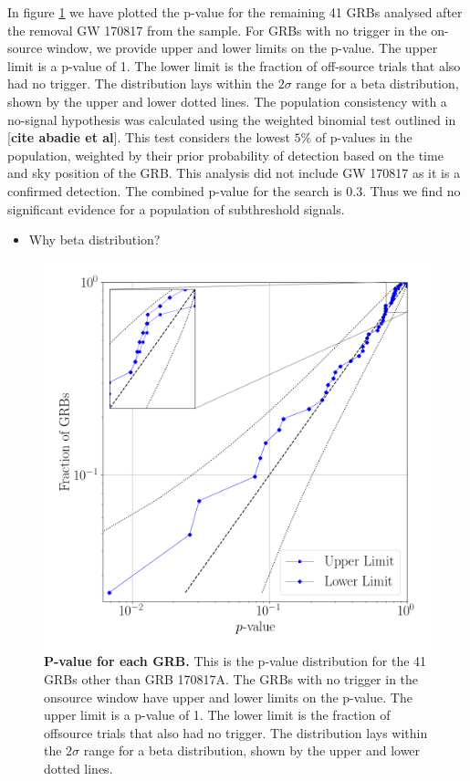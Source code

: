 \documentclass[11pt]{cuthesis}
\begin{document}
In figure \ref{fig:pvalue} we have plotted the p-value for the remaining 41 GRBs analysed after the removal GW 170817 from the sample. For GRBs with no trigger in the on-source window, we provide upper and lower limits on the p-value. The upper limit is a p-value of 1. The lower limit is the fraction of off-source trials that also had no trigger. The distribution lays within the $2\sigma$ range for a beta distribution, shown by the upper and lower dotted lines. The population consistency with a no-signal hypothesis was calculated using the weighted binomial test outlined in [\textbf{cite abadie et al}]. This test considers the lowest $5\%$ of p-values in the population, weighted by their prior probability of detection based on the time and sky position of the GRB. This analysis did not include GW 170817 as it is a confirmed detection. The combined p-value for the search is 0.3. Thus we find no significant evidence for a population of subthreshold signals.  
\begin{itemize}
\item Why beta distribution?
\end{itemize}

\begin{figure}
\begin{center}
\includegraphics[width=0.8\linewidth]{pygrb_pvalue.png}
\end{center}
\caption{\textbf{P-value for each GRB.} This is the p-value distribution for the 41 GRBs other than GRB 170817A. The GRBs with no trigger in the onsource window have upper and lower limits on the p-value. The upper limit is a p-value of 1. The lower limit is the fraction of offsource trials that also had no trigger. The distribution lays within the $2\sigma$ range for a beta distribution, shown by the upper and lower dotted lines.  }
\label{fig:pvalue}
\end{figure}
\end{document}
